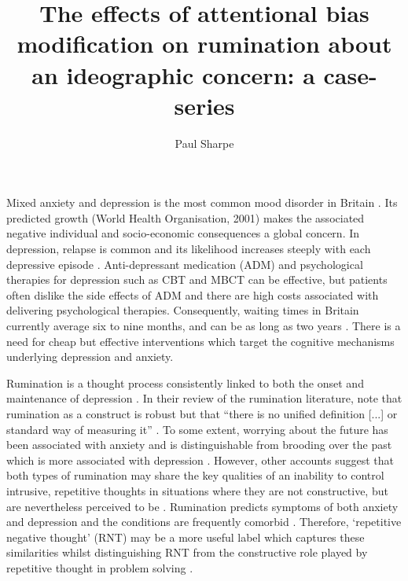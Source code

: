 \documentclass[man,floatsintext,a4paper,biblatex]{apa6}
\title{The effects of attentional bias modification on rumination about an ideographic concern: a case-series}
\author{Paul Sharpe}
\affiliation{University of Exeter}
\begin{document}
\maketitle
{}
\tableofcontents
\clearpage\setcounter{page}{1}

Mixed anxiety and depression is the most common mood disorder in Britain
\parencite{haliwell_fundamental_2007}.  Its predicted growth (World
Health Organisation, 2001) makes the associated negative individual and
socio-economic consequences a global concern.  In depression, relapse
is common and its likelihood increases steeply with each depressive
episode \parencite{haliwell_fundamental_2007}.  Anti-depressant
medication (ADM) and psychological therapies for depression such as
CBT and MBCT can be effective, but patients often dislike the side
effects of ADM and there are high costs associated with delivering
psychological therapies.  Consequently, waiting times in Britain
currently average six to nine months, and can be as long as two years
\parencite{haliwell_fundamental_2007}.  There is a need for cheap but
effective interventions which target the cognitive mechanisms underlying
depression and anxiety.

Rumination is a thought process consistently linked to both the onset and
maintenance of depression \parencite{watkins_habit-goal_2014}.  In their
review of the rumination literature, \textcite{smith_roadmap_2009}
note that rumination as a construct is robust but that ``there
is no unified definition [...] or standard way of measuring
it'' \textcite[][p. 117]{smith_roadmap_2009}.  To some extent,
worrying about the future has been associated with anxiety and is
distinguishable from brooding over the past which is more associated
with depression \parencite{papageorgiou_depressive_2004}.  However,
other accounts \parencite{watkins_comparisons_2005} suggest
that both types of rumination may share the key qualities of an
inability to control intrusive, repetitive thoughts in situations
where they are not constructive, but are nevertheless perceived to be
\parencite{watkins_constructive_2008}.  Rumination predicts symptoms of
both anxiety and depression \parencite{nolen-hoeksema_role_2000} and the
conditions are frequently comorbid \parencite{krusche_mindfulness_2013}.
Therefore, `repetitive negative thought' (RNT) may be a more useful
label which captures these similarities whilst distinguishing RNT from
the constructive role played by repetitive thought in problem solving
\parencite{watkins_constructive_2008}.
\end{document}
